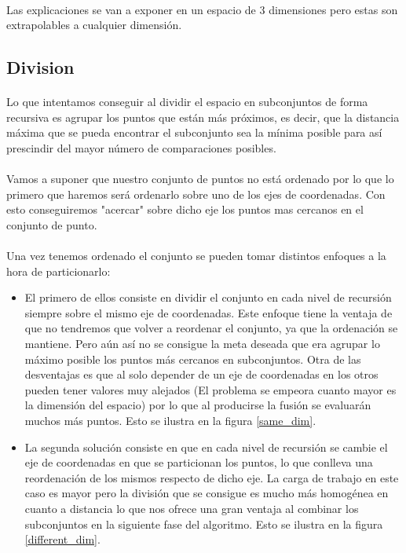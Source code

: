 \documentclass{article}
\begin{document}
	\paragraph{}
	Las explicaciones se van a exponer en un espacio de 3 dimensiones pero estas son extrapolables a cualquier dimensión.

	\subsection{Division}
		
		\paragraph{}
		Lo que intentamos conseguir al dividir el espacio en subconjuntos de forma recursiva es agrupar los puntos que están más próximos, es decir, que la distancia máxima que se pueda encontrar el subconjunto sea la mínima posible para así prescindir del mayor número de comparaciones posibles. 
		
		\paragraph{}
		Vamos a suponer que nuestro conjunto de puntos no está ordenado por lo que lo primero que haremos será ordenarlo sobre uno de los ejes de coordenadas. Con esto conseguiremos "acercar" sobre dicho eje los puntos mas cercanos en el conjunto de punto.
		
		\paragraph{}
		Una vez tenemos ordenado el conjunto se pueden tomar distintos enfoques a la hora de particionarlo:
		
		\begin{itemize}

			\item
			El primero de ellos consiste en dividir el conjunto en cada nivel de recursión siempre sobre el mismo eje de coordenadas. Este enfoque tiene la ventaja de que no tendremos que volver a reordenar el conjunto, ya que la ordenación se mantiene. Pero aún así no se consigue la meta deseada que era agrupar lo máximo posible los puntos más cercanos en subconjuntos. Otra de las desventajas es que al solo depender de un eje de coordenadas en los otros pueden tener valores muy alejados (El problema se empeora cuanto mayor es la dimensión del espacio) por lo que al producirse la fusión se evaluarán muchos más puntos. Esto se ilustra en la figura \ref{same_dim}.

			\item
			La segunda solución consiste en que en cada nivel de recursión se cambie el eje de coordenadas en que se particionan los puntos, lo que conlleva una reordenación de los mismos respecto de dicho eje. La carga de trabajo en este caso es mayor pero la división que se consigue es mucho más homogénea en cuanto a distancia lo que nos ofrece una gran ventaja al combinar los subconjuntos en la siguiente fase del algoritmo. Esto se ilustra en la figura \ref{different_dim}.

		\end{itemize}
		
\end{document}
